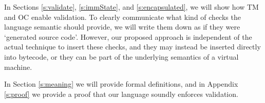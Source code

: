 In Sections \ref{s:validate}, \ref{s:immState}, and \ref{s:encapsulated}, we will show how TM and OC enable validation.
To clearly communicate what kind of checks the language semantic should provide,
 we will write them down as if they were `generated source code'.
However, our proposed approach is independent of the actual technique to insert these checks, and they may instead be inserted directly into bytecode, or they can be part of the underlying semantics of a virtual machine.

In Section \ref{s:meaning} we will provide formal definitions, and in Appendix \ref{s:proof} we provide  a proof that our language soundly enforces validation.




